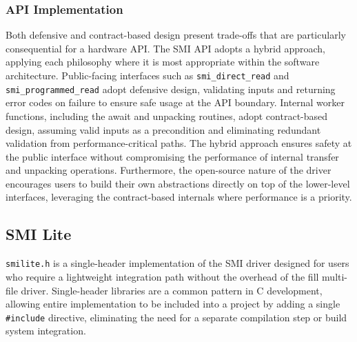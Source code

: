 \documentclass[final]{cmpreport}
\begin{document}

\subsubsection{API Implementation}
Both defensive and contract-based design present trade-offs that are particularly consequential for a hardware API. The SMI API adopts a hybrid approach, applying each philosophy where it is most appropriate within the software architecture. Public-facing interfaces such as \texttt{smi\_direct\_read} and \texttt{smi\_programmed\_read} adopt defensive design, validating inputs and returning error codes on failure to ensure safe usage at the API boundary. Internal worker functions, including the await and unpacking routines, adopt contract-based design, assuming valid inputs as a precondition and eliminating redundant validation from performance-critical paths. The hybrid approach ensures safety at the public interface without compromising the performance of internal transfer and unpacking operations. Furthermore, the open-source nature of the driver encourages users to build their own abstractions directly on top of the lower-level interfaces, leveraging the contract-based internals where performance is a priority.

\subsection{SMI Lite}
\texttt{smilite.h} is a single-header implementation of the SMI driver designed for users who require a lightweight integration path without the overhead of the fill multi-file driver. Single-header libraries are a common pattern in C development, allowing entire implementation to be included into a project by adding a single \texttt{\#include} directive, eliminating the need for a separate compilation step or build system integration.
\end{document}

